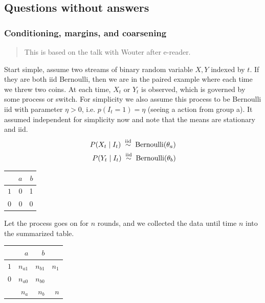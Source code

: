 \subsection{Questions without answers}

\subsubsection{Conditioning, margins, and coarsening}


\begin{quote}
	This is based on the talk with Wouter after e-reader.
\end{quote}

Start simple, assume two streams of binary random variable $X,Y$ indexed by $t$.
If they are both iid Bernoulli, then we are in the paired example where each time we threw two coins.
At each time, $X_t$ or $Y_t$ is observed, which is governed by some process or switch.
For simplicity we also assume this process to be Bernoulli iid with parameter $\eta>0$, i.e.
$p(I_t=1) = \eta$ (seeing a action from group a).
It assumed independent for simplicity now and note that the means are stationary and iid.
\begin{align*}
	P(X_t \mid I_t) \iid \mathrm{Bernoulli}(\theta_a) \\
	P(Y_t \mid I_t) \iid \mathrm{Bernoulli}(\theta_b)
\end{align*}

\begin{table}[h]
	\centering
	\begin{tabular}{lrr}
		\toprule
		    & $a$ & $b$ \\
		\midrule
		$1$ & 0   & 1   \\
		$0$ & 0   & 0   \\
		\bottomrule
	\end{tabular}
\end{table}

Let the process goes on for $n$ rounds, and we collected the data until time $n$ into the summarized table.
\begin{table}[h]
	\centering
	\begin{tabular}{lrrr}
		\toprule
		    & $a$      & $b$      &       \\
		\midrule
		$1$ & $n_{a1}$ & $n_{b1}$ & $n_1$ \\
		$0$ & $n_{a0}$ & $n_{b0}$ &       \\
		    & $n_a$    & $n_b$    & $n$   \\
		\bottomrule
	\end{tabular}
\end{table}

